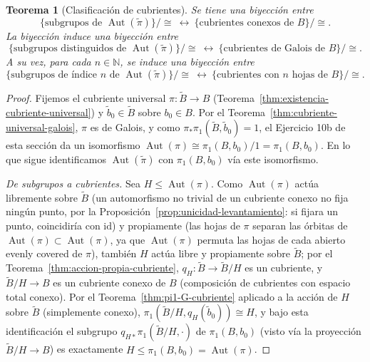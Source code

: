 \documentclass[11pt,a4paper]{article}
\theoremstyle{plain}
\newtheorem{theorem}{Teorema}[section]
\theoremstyle{definition}
\theoremstyle{remark}
\newcommand{\NN}{\mathbb N}
\DeclareMathOperator{\Aut}{Aut}
\begin{document}
\begin{theorem}[Clasificación de cubrientes]
\label{thm:clasificacion-cubrientes}
Se tiene una biyección entre
\[
\{\text{subgrupos de } \Aut(\tilde\pi)\}/\!\cong \ \leftrightarrow\ \{\text{cubrientes conexos de } B\}/\!\cong.
\]
La biyección induce una biyección entre
\[
\{\text{subgrupos distinguidos de } \Aut(\tilde\pi)\}/\!\cong \ \leftrightarrow\ \{\text{cubrientes de Galois de } B\}/\!\cong.
\]
A su vez, para cada $n\in\NN$, se induce una biyección entre
\[
\{\text{subgrupos de índice } n \text{ de } \Aut(\tilde\pi)\}/\!\cong \ \leftrightarrow\ \{\text{cubrientes con } n \text{ hojas de } B\}/\!\cong.
\]
\end{theorem}

\begin{proof}
Fijemos el cubriente universal $\pi:\tilde B\to B$
(Teorema~\ref{thm:existencia-cubriente-universal}) y $\tilde b_0\in\tilde B$
sobre $b_0\in B$. Por el Teorema~\ref{thm:cubriente-universal-galois},
$\pi$ es de Galois, y como $\pi_*\pi_1(\tilde B,\tilde b_0)=1$, el
Ejercicio 10b de esta sección da un isomorfismo
$\Aut(\pi)\cong\pi_1(B,b_0)/1=\pi_1(B,b_0)$. En lo que sigue identificamos
$\Aut(\tilde\pi)$ con $\pi_1(B,b_0)$ vía este isomorfismo.

\emph{De subgrupos a cubrientes.} Sea $H\le\Aut(\pi)$. Como $\Aut(\pi)$
actúa libremente sobre $\tilde B$ (un automorfismo no trivial de un
cubriente conexo no fija ningún punto, por la
Proposición~\ref{prop:unicidad-levantamiento}: si fijara un punto,
coincidiría con $\mathrm{id}$) y propiamente (las hojas de $\pi$ separan
las órbitas de $\Aut(\pi)\subset\Aut(\pi)$, ya que $\Aut(\pi)$ permuta las
hojas de cada abierto evenly covered de $\pi$), también $H$ actúa libre y
propiamente sobre $\tilde B$; por el
Teorema~\ref{thm:accion-propia-cubriente}, $q_H:\tilde B\to\tilde B/H$ es
un cubriente, y $\tilde B/H\to B$ es un cubriente conexo de $B$ (composición
de cubrientes con espacio total conexo). Por el
Teorema~\ref{thm:pi1-G-cubriente} aplicado a la acción de $H$ sobre
$\tilde B$ (simplemente conexo), $\pi_1(\tilde B/H,q_H(\tilde b_0))\cong H$,
y bajo esta identificación el subgrupo $q_{H*}\pi_1(\tilde B/H,\cdot)$ de
$\pi_1(B,b_0)$ (visto vía la proyección $\tilde B/H\to B$) es exactamente
$H\le\pi_1(B,b_0)=\Aut(\pi)$.


\end{proof}
\end{document}
